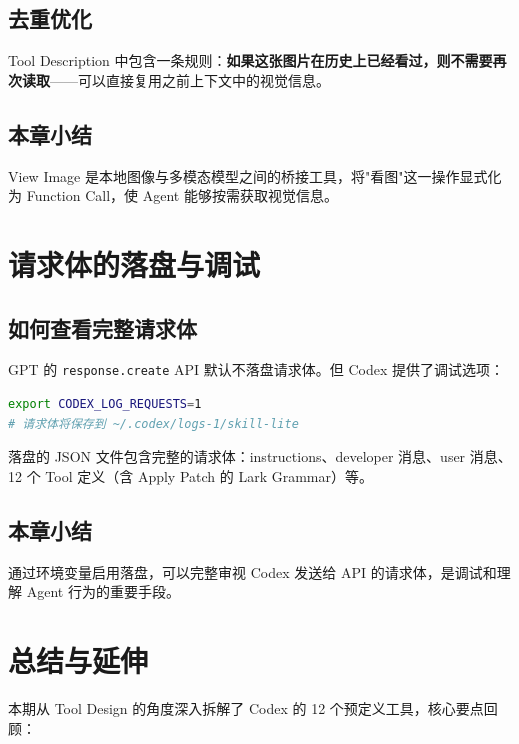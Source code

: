 \documentclass[a4paper]{article}
\begin{document}
\subsection{去重优化}

Tool Description 中包含一条规则：\textbf{如果这张图片在历史上已经看过，则不需要再次读取}——可以直接复用之前上下文中的视觉信息。

\subsection{本章小结}

View Image 是本地图像与多模态模型之间的桥接工具，将"看图"这一操作显式化为 Function Call，使 Agent 能够按需获取视觉信息。


\section{请求体的落盘与调试}

\subsection{如何查看完整请求体}

GPT 的 \texttt{response.create} API 默认不落盘请求体。但 Codex 提供了调试选项：

\begin{lstlisting}[caption={启用请求体落盘的环境变量}, language=bash]
export CODEX_LOG_REQUESTS=1
# 请求体将保存到 ~/.codex/logs-1/skill-lite
\end{lstlisting}

落盘的 JSON 文件包含完整的请求体：instructions、developer 消息、user 消息、12 个 Tool 定义（含 Apply Patch 的 Lark Grammar）等。

\subsection{本章小结}

通过环境变量启用落盘，可以完整审视 Codex 发送给 API 的请求体，是调试和理解 Agent 行为的重要手段。


\section{总结与延伸}

本期从 Tool Design 的角度深入拆解了 Codex 的 12 个预定义工具，核心要点回顾：
\end{document}
